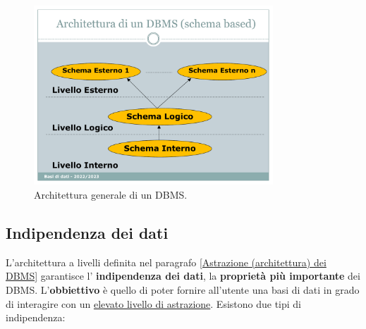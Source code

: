 \documentclass[a4paper]{article}
\begin{document}
	\begin{figure}[!htp]
		\centering
		\includegraphics[width=0.8\textwidth]{img/arch_DBMS.pdf}
		\caption{Architettura generale di un DBMS.}
	\end{figure}

	\newpage
	
	
	
	
	\subsection{Indipendenza dei dati}
	
	L'architettura a livelli definita nel paragrafo \ref{Astrazione (architettura) dei DBMS} garantisce l' \textcolor{Red3}{\textbf{indipendenza dei dati}}, la \textbf{proprietà più importante} dei DBMS. L'\textbf{obbiettivo} è quello di poter fornire all'utente una basi di dati in grado di interagire con un \underline{elevato livello di astrazione}. Esistono due tipi di indipendenza:
	
\end{document}
